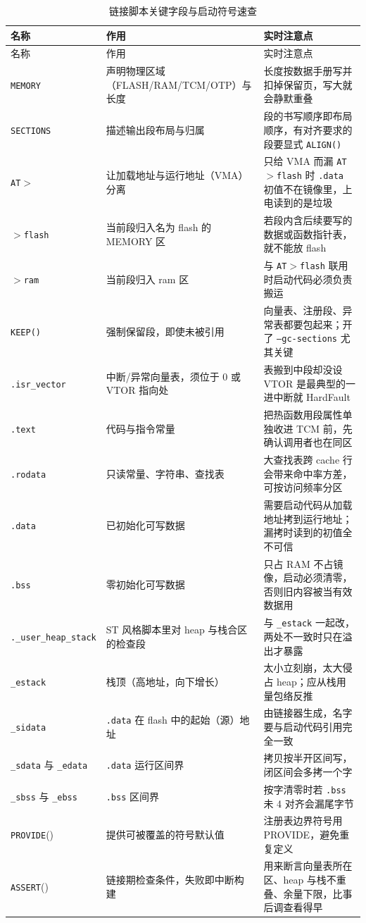 \documentclass[12pt,a4paper,fontset=fandol]{ctexbook}
\newcommand{\Fn}[1]{\texttt{#1()}}
\newcommand{\Tp}[1]{\texttt{#1}}
\begin{document}
\begin{longtable}{>{\raggedright\arraybackslash\footnotesize}p{} >{\raggedright\arraybackslash\footnotesize}p{} >{\raggedright\arraybackslash\footnotesize}p{}}
\caption{链接脚本关键字段与启动符号速查}\label{tab:apB-linker} \\
\toprule 名称 & 作用 & 实时注意点 \\ \midrule
\endfirsthead
\toprule 名称 & 作用 & 实时注意点 \\ \midrule
\endhead
\bottomrule \endfoot
\endlastfoot
\Tp{MEMORY} & 声明物理区域（FLASH/RAM/TCM/OTP）与长度 & 长度按数据手册写并扣掉保留页，写大就会静默重叠 \\
\Tp{SECTIONS} & 描述输出段布局与归属 & 段的书写顺序即布局顺序，有对齐要求的段要显式 \Fn{ALIGN} \\
\Tp{AT$>$} & 让加载地址与运行地址（VMA）分离 & 只给 VMA 而漏 \Tp{AT$>$flash} 时 \Tp{.data} 初值不在镜像里，上电读到的是垃圾 \\
\Tp{$>$flash} & 当前段归入名为 flash 的 MEMORY 区 & 若段内含后续要写的数据或函数指针表，就不能放 flash \\
\Tp{$>$ram} & 当前段归入 ram 区 & 与 \Tp{AT$>$flash} 联用时启动代码必须负责搬运 \\
\Tp{KEEP()} & 强制保留段，即使未被引用 & 向量表、注册段、异常表都要包起来；开了 \Tp{--gc-sections} 尤其关键 \\
\Tp{.isr\_vector} & 中断/异常向量表，须位于 0 或 VTOR 指向处 & 表搬到中段却没设 VTOR 是最典型的一进中断就 HardFault \\
\Tp{.text} & 代码与指令常量 & 把热函数用段属性单独收进 TCM 前，先确认调用者也在同区 \\
\Tp{.rodata} & 只读常量、字符串、查找表 & 大查找表跨 cache 行会带来命中率方差，可按访问频率分区 \\
\Tp{.data} & 已初始化可写数据 & 需要启动代码从加载地址拷到运行地址；漏拷时读到的初值全不可信 \\
\Tp{.bss} & 零初始化可写数据 & 只占 RAM 不占镜像，启动必须清零，否则旧内容被当有效数据用 \\
\Tp{.\_user\_heap\_stack} & ST 风格脚本里对 heap 与栈合区的检查段 & 与 \Tp{\_estack} 一起改，两处不一致时只在溢出才暴露 \\
\Tp{\_estack} & 栈顶（高地址，向下增长） & 太小立刻崩，太大侵占 heap；应从栈用量包络反推 \\
\Tp{\_sidata} & \Tp{.data} 在 flash 中的起始（源）地址 & 由链接器生成，名字要与启动代码引用完全一致 \\
\Tp{\_sdata} 与 \Tp{\_edata} & \Tp{.data} 运行区间界 & 拷贝按半开区间写，闭区间会多拷一个字 \\
\Tp{\_sbss} 与 \Tp{\_ebss} & \Tp{.bss} 区间界 & 按字清零时若 \Tp{.bss} 未 4 对齐会漏尾字节 \\
\Tp{PROVIDE}() & 提供可被覆盖的符号默认值 & 注册表边界符号用 PROVIDE，避免重复定义 \\
\Tp{ASSERT}() & 链接期检查条件，失败即中断构建 & 用来断言向量表所在区、heap 与栈不重叠、余量下限，比事后调查看得早 \\
\end{longtable}
\end{document}
